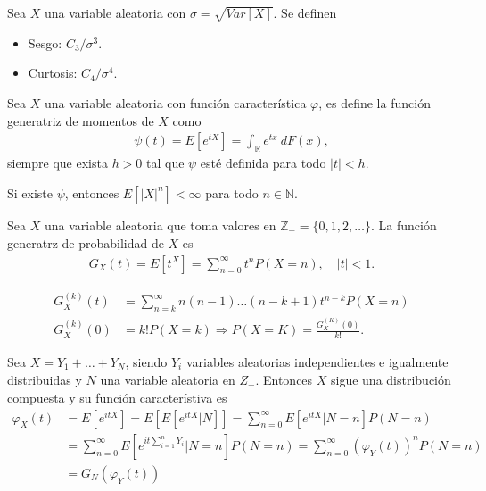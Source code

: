 \begin{defi}
    Sea $X$ una variable aleatoria con $\sigma = \sqrt{Var[X]}$. Se definen
    \begin{itemize}
        \item Sesgo: $C_3 / \sigma^3$.
        \item Curtosis: $C_4 / \sigma^4$.
    \end{itemize}
\end{defi}

\begin{defi}
    Sea $X$ una variable aleatoria con función característica $\varphi$, es define la función generatriz de momentos de $X$ como
    \begin{align*}
        \psi(t) = E \left[ e^{tX} \right] = \int_{\mathbb{R}} e^{tx} \ dF(x),
    \end{align*}
    siempre que exista $h > 0$ tal que $\psi$ esté definida para todo $|t| < h$.
\end{defi}

\begin{obs}
    Si existe $\psi$, entonces $E[|X|^n] < \infty$ para todo $n \in \mathbb{N}$.
\end{obs}

\begin{defi}
    Sea $X$ una variable aleatoria que toma valores en $\mathbb{Z}_+ = \{0,1,2,\ldots\}$. La función generatrz de probabilidad de $X$ es
    \begin{align*}
        G_X(t) = E \left[t^X \right] = \sum_{n=0}^{\infty} t^n P(X = n), \quad |t| < 1.
    \end{align*}
\end{defi}

\begin{obs}
    \begin{align*}
        G_X^{(k)}(t) &= \sum_{n=k}^{\infty} n(n-1) \ldots (n-k+1) t^{n-k}P(X = n) \\
        G_X^{(k)}(0) &= k! P(X = k) \Longrightarrow P(X = K) = \frac{G_X^{(K)}(0)}{k!}.
    \end{align*}
\end{obs}

\begin{obs}
    Sea $X = Y_1+\ldots+Y_N$, siendo $Y_i$ variables aleatorias independientes e igualmente distribuidas y $N$ una variable aleatoria en $Z_+$. Entonces $X$ sigue una distribución compuesta y su función característiva es
    \begin{align*}
        \varphi_X(t) &= E \left[e^{itX} \right] = E\left[ E \left[e^{itX} | N \right]\right] = \sum_{n=0}^{\infty} E \left[ e^{itX} | N = n \right] P(N = n) \\
        &= \sum_{n=0}^{\infty} E \left[ e^{it \sum_{i=1}^{n} Y_i} | N = n \right] P(N = n) = \sum_{n=0}^{\infty} \left( \varphi_Y(t) \right)^n P(N = n) \\
        &= G_N \left( \varphi_Y(t) \right)
    \end{align*}
\end{obs}


